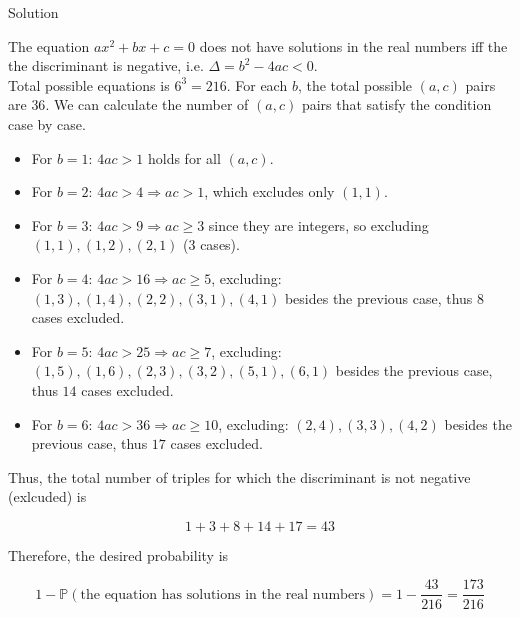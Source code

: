 \begin{qlsolution}{Solution}

The equation \(\mathit{a}\mathit{x}^{2} + \mathit{b}\mathit{x} + \mathit{c} = 0\) does not have solutions in the real numbers iff the the discriminant is negative, i.e. \(\Delta = \mathit{b}^{2} - 4\mathit{a}\mathit{c} < 0\).\\
Total possible equations is \(6^{3} = 216\). For each \(\mathit{b}\), the total possible \((\mathit{a},\mathit{c})\) pairs are \(36\). We can calculate the number of \((\mathit{a},\mathit{c})\) pairs that satisfy the condition case by case.

\begin{itemize}
\item
  For \(\mathit{b} = 1\): \(4\mathit{a}\mathit{c} > 1\) holds for all \((\mathit{a},\mathit{c})\).
\item
  For \(\mathit{b} = 2\): \(4\mathit{a}\mathit{c} > 4\Longrightarrow\mathit{a}\mathit{c} > 1\), which excludes only \((1,1)\).
\item
  For \(\mathit{b} = 3\): \(4\mathit{a}\mathit{c} > 9\Longrightarrow\mathit{a}\mathit{c} \geq 3\) since they are integers, so excluding \((1,1),(1,2),(2,1)\) (\(3\) cases).
\item
  For \(\mathit{b} = 4\): \(4\mathit{a}\mathit{c} > 16\Longrightarrow\mathit{a}\mathit{c} \geq 5\), excluding: \((1,3),(1,4),(2,2),(3,1),(4,1)\) besides the previous case, thus \(8\) cases excluded.
\item
  For \(\mathit{b} = 5\): \(4\mathit{a}\mathit{c} > 25\Longrightarrow\mathit{a}\mathit{c} \geq 7\), excluding: \((1,5),(1,6),(2,3),(3,2),(5,1),(6,1)\) besides the previous case, thus \(14\) cases excluded.
\item
  For \(\mathit{b} = 6\): \(4\mathit{a}\mathit{c} > 36\Longrightarrow\mathit{a}\mathit{c} \geq 10\), excluding: \((2,4),(3,3),(4,2)\) besides the previous case, thus \(17\) cases excluded.
\end{itemize}

Thus, the total number of triples for which the discriminant is not negative (exlcuded) is

\[1 + 3 + 8 + 14 + 17 = 43\]

Therefore, the desired probability is

\[1 - \mathbb{P}(\text{the equation has solutions in the real numbers}) = 1 - \frac{43}{216} = \frac{173}{216}\]

\end{qlsolution}

